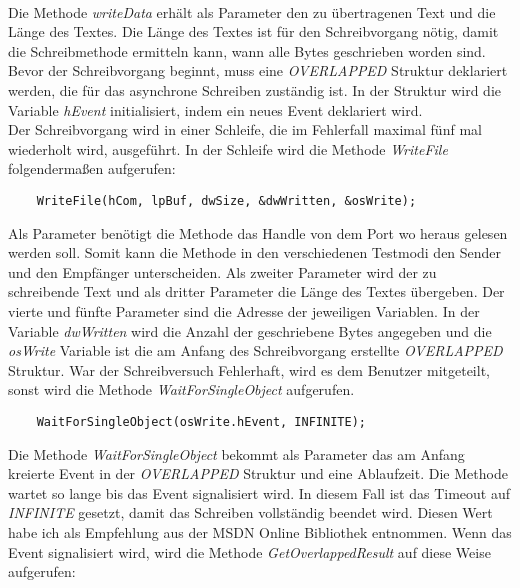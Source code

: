 \paragraph{}
Die Methode \textit{writeData} erhält als Parameter den zu übertragenen Text und die Länge des Textes. Die Länge des Textes ist für den Schreibvorgang nötig, damit die Schreibmethode ermitteln kann, wann alle Bytes geschrieben worden sind. Bevor der Schreibvorgang beginnt, muss eine \textit{OVERLAPPED} Struktur deklariert werden, die für das asynchrone Schreiben zuständig ist. In der Struktur wird die Variable \textit{hEvent} initialisiert, indem ein neues Event deklariert wird.\\

Der Schreibvorgang wird in einer Schleife, die im Fehlerfall maximal fünf mal wiederholt wird, ausgeführt. In der Schleife wird die Methode \textit{WriteFile} folgendermaßen aufgerufen:
\begin{lstlisting}
	WriteFile(hCom, lpBuf, dwSize, &dwWritten, &osWrite);
\end{lstlisting}

Als Parameter benötigt die Methode das Handle von dem Port wo heraus gelesen werden soll. Somit kann die Methode in den verschiedenen Testmodi den Sender und den Empfänger unterscheiden. Als zweiter Parameter wird der zu schreibende Text und als dritter Parameter die Länge des Textes übergeben. Der vierte und fünfte Parameter sind die Adresse der jeweiligen Variablen. In der Variable \textit{dwWritten} wird die Anzahl der geschriebene Bytes angegeben und die \textit{osWrite} Variable ist die am Anfang des Schreibvorgang erstellte \textit{OVERLAPPED} Struktur. War der Schreibversuch Fehlerhaft, wird es dem Benutzer mitgeteilt, sonst wird die Methode \textit{WaitForSingleObject} aufgerufen.

\begin{lstlisting}
	WaitForSingleObject(osWrite.hEvent, INFINITE);
\end{lstlisting}

Die Methode \textit{WaitForSingleObject} bekommt als Parameter das am Anfang kreierte Event in der \textit{OVERLAPPED} Struktur und eine Ablaufzeit. Die Methode wartet so lange bis das Event signalisiert wird. In diesem Fall ist das Timeout auf \textit{INFINITE} gesetzt, damit das Schreiben vollständig beendet wird. Diesen Wert habe ich als Empfehlung aus der MSDN Online Bibliothek\cite{SerialCommunications} entnommen. Wenn das Event signalisiert wird, wird die Methode \textit{GetOverlappedResult} auf diese Weise aufgerufen:


